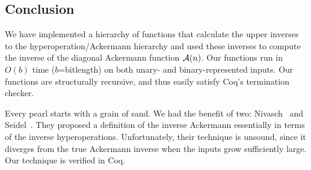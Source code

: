 
\subsection{Conclusion}
We have implemented a hierarchy of functions that calculate the upper inverses
to the hyperoperation/Ackermann hierarchy and used these inverses
to compute the inverse of the diagonal Ackermann function $\mathcal{A}(n)$.
Our functions run in $O(b)$ time ($b$=bitlength) on both unary- and 
binary-represented inputs.  Our functions are structurally recursive, 
and thus easily satisfy Coq's termination checker.

Every pearl starts with a grain of sand.  We had the benefit of two:
Nivasch~\cite{nivasch} and Seidel~\cite{seidel}.
They proposed a definition of the inverse Ackermann essentially in terms of
the inverse hyperoperations.  Unfortunately, their technique is unsound, since it diverges from
the true Ackermann inverse when the inputs grow sufficiently large.  Our technique is verified in Coq.








